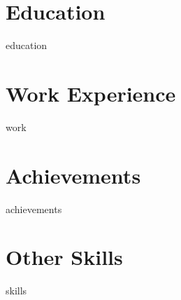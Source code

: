 \documentclass[a4paper, skipsamekey, 11pt, german]{cv}
\begin{document}
\maketitle

\section{\faGraduationCap \hspace{1em} Education}{education}
\section{\faBriefcase \hspace{1em} Work Experience}{work}
\section{\faTrophy \hspace{1em} Achievements}{achievements}
\section{\faStar \hspace{1em} Other Skills}{skills}
\end{document}

